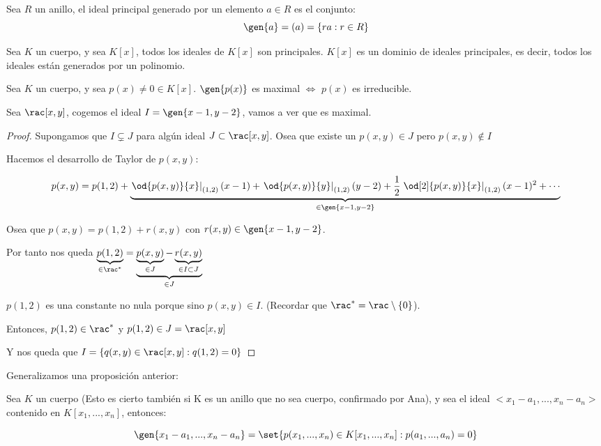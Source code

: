 \begin{example}
	Sea $R$ un anillo, el ideal principal generado por un elemento $a \in R$ es el conjunto:
	$$ \gen{a}=(a)=\{ra: r \in R \} $$
\end{example}

\begin{prop}
	Sea $K$ un cuerpo, y sea $K[x]$, todos los ideales de $K[x]$ son principales. $K[x]$ es un dominio de ideales principales, es decir, todos los ideales están generados por un polinomio.
\end{prop}

\begin{prop}
Sea $K$ un cuerpo, y sea $p(x)\neq 0 \in K[x]$. $\gen{p(x)}$ es maximal $\Leftrightarrow$ $p(x)$ es irreducible.
\end{prop}

\begin{example}
Sea $\rac[x,y]$, cogemos el ideal $I=\gen{x-1,y-2}$, vamos a ver que es maximal.

\begin{proof}
	Supongamos que $I \subsetneq J$ para algún ideal $J \subset \rac[x,y]$. Osea que existe un $p(x,y) \in J$ pero $p(x,y) \notin I$

	Hacemos el desarrollo de Taylor de $p(x,y)$:

	$$ p(x,y)=p(1,2) + \underbrace{\left.\od{p(x,y)}{x}\right|_{(1,2)} (x-1)+ \left.\od{p(x,y)}{y}\right|_{(1,2)} (y-2)+\frac{1}{2}\left.\od[2]{p(x,y)}{x}\right|_{(1,2)} (x-1)^2+ \dotsb }_{\in \gen{x-1,y-2}}$$

	Osea que $p(x,y)=p(1,2)+r(x,y)$ con $r(x,y) \in \gen{x-1,y-2}$.

	Por tanto nos queda $\underbrace{p(1,2)}_{\in \rac^*}=\underbrace{\underbrace{p(x,y)}_{\in J}-\underbrace{r(x,y)}_{\in I \subset J}}_{\in J}$

	$p(1,2)$ es una constante no nula porque sino $p(x,y) \in I$. (Recordar que $\rac^*=\rac\setminus\{0\}$).

	Entonces, $p(1,2) \in \rac^*$ y $p(1,2) \in J =\rac[x,y]$

	Y nos queda que $I=\{ q(x,y) \in \rac[x,y]: q(1,2)=0 \}$
\end{proof}
\end{example}

Generalizamos una proposición anterior:
\begin{prop}
	Sea $K$ un cuerpo (Esto es cierto también si K es un anillo que no sea cuerpo, confirmado por Ana), y sea el ideal $<x_1-a_1,...,x_n-a_n>$ contenido en $K[x_1,...,x_n]$, entonces:

	$$\gen{x_1-a_1,...,x_n-a_n}=\set{p(x_1,...,x_n)\in K[x_1,...,x_n]:p(a_1,...,a_n)=0 }$$
\end{prop}


